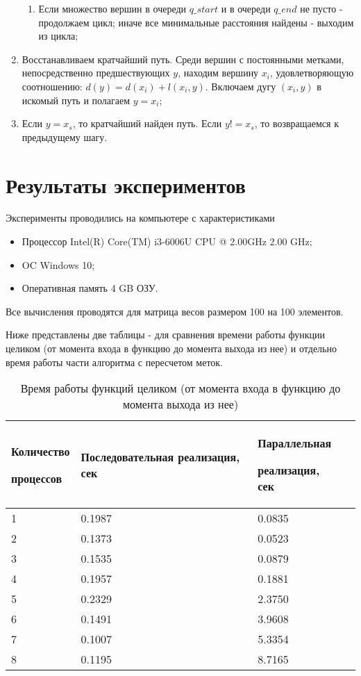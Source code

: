 \documentclass{report}
\begin{document}
\begin{enumerate}
\begin{enumerate}
	 \item Если множество вершин в очереди $q\_start$ и в очереди $q\_end$ не пусто - продолжаем цикл; иначе все минимальные расстояния найдены - выходим из цикла;
	\end{enumerate}
 \item Восстанавливаем кратчайший путь. Среди вершин с постоянными метками, непосредственно предшествующих $y$,
	находим вершину $x_{i}$, удовлетворяющую соотношению: $d(y)=d(x_{i})+l(x_{i},y)$. Включаем дугу $(x_{i}, y)$ в искомый путь и полагаем $y=x_{i}$;
 \item Если $y=x_{s}$, то кратчайший найден путь. Если $y!=x_{s}$, то возвращаемся к предыдущему шагу.
\end{enumerate}

\newpage

\section{Результаты экспериментов}

Эксперименты проводились на компьютере с характеристиками
\begin{itemize}
 \item Процессор Intel(R) Core(TM) i3-6006U CPU @ 2.00GHz 2.00 GHz;
 \item OC Windows 10;
 \item Оперативная память 4 GB ОЗУ.
\end{itemize}
\par

Все вычисления проводятся для матрица весов размером 100 на 100 элементов.
\par

Ниже представлены две таблицы - для сравнения времени работы функции целиком (от момента входа в функцию до момента выхода из нее)
и отдельно время работы части алгоритма с пересчетом меток.
\par

\begin{table}[h]
    \begin{tabular}{ | p{4cm} | p{4cm} | p{4cm} | p{4cm} | }
    \hline
    Количество \par процессов & Последовательная реализация, сек & Параллельная \par реализация, сек\\ \hline
    1    &0.1987  & 0.0835  \\ \hline
    2    &0.1373  & 0.0523  \\ \hline
    3    &0.1535  & 0.0879  \\ \hline
    4    &0.1957  & 0.1881  \\ \hline
    5    &0.2329  & 2.3750  \\ \hline
    6    &0.1491  & 3.9608  \\ \hline
    7    &0.1007  & 5.3354  \\ \hline
    8    &0.1195  & 8.7165  \\ \hline
    \end{tabular}
    \caption{Время работы функций целиком (от момента входа в функцию до момента выхода из нее)}
\end{table}
\end{document}
